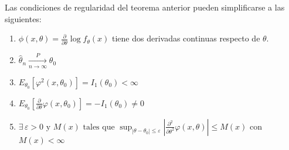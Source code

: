 \begin{observación}
Las condiciones de regularidad del teorema anterior pueden simplificarse a las siguientes:\\
\begin{enumerate}
  \item $\phi (x, \theta) = \frac{\partial}{\partial \theta} \log f_{\theta}(x)$ tiene dos derivadas continuas respecto de $\theta$.
  \item $\hat{\theta}_n \xrightarrow[n \to \infty]{P} \theta_0$
  \item $E_{\theta_0}[\varphi^2(x, \theta_0)] = I_1(\theta_0) < \infty$
  \item $E_{\theta_0} \left[ \frac{\partial}{\partial \theta} \varphi(x, \theta_0) \right] = - I_1(\theta_0) \neq 0$
  \item $\exists \, \varepsilon > 0 \text{ y } M(x) \text{ tales que } \sup_{|\theta - \theta_0| \leq \varepsilon} \left| \frac{\partial^2}{\partial \theta^2} \varphi(x, \theta) \right| \leq M(x)$ con $M(x) < \infty$
\end{enumerate}
\end{observación}
